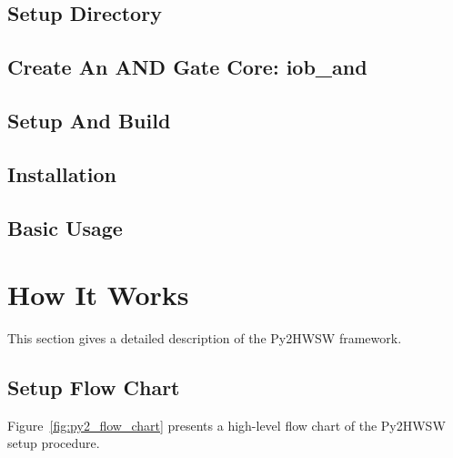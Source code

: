 \documentclass{ug}
\begin{document}
\subsection{Setup Directory}
\label{sec:setup_dir}


\subsection{Create An AND Gate Core: iob\_and}
\label{sec:iob_and}


\subsection{Setup And Build}
\label{sec:setup_build}


\subsection{Installation}
\label{sec:installation}


\subsection{Basic Usage}
\label{sec:basic_usage}


%
%
\ifdefined\SECTIONCLEARPAGE
\clearpage
\fi
\section{How It Works}
\label{sec:how_it_works}

This section gives a detailed description of the Py2HWSW framework.

% 
% 
% 

\subsection{Setup Flow Chart}
\label{sec:py2_flow_chart}

Figure~\ref{fig:py2_flow_chart} presents a high-level flow chart of the Py2HWSW setup procedure.
\end{document}
